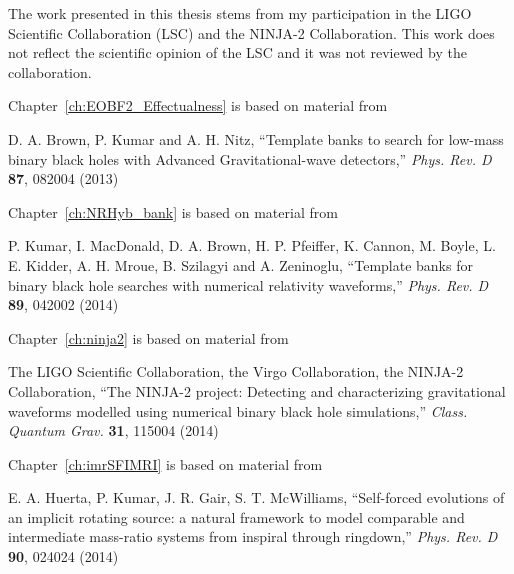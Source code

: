 
The work presented in this thesis stems from my participation in the
LIGO Scientific Collaboration (LSC) and the NINJA-2 Collaboration.  This
work does not reflect the scientific opinion of the LSC and it was not
reviewed by the collaboration.

\vspace*{0.5cm}

\noindent Chapter~\ref{ch:EOBF2_Effectualness} is based on material from

\vspace*{0.25cm}

\noindent D. A. Brown, P. Kumar and A. H. Nitz, ``Template banks to 
search for low-mass binary black holes with Advanced Gravitational-wave 
detectors,''
{\it Phys. Rev. D} {\bf 87}, 082004 (2013)

\vspace*{0.5cm}

\noindent Chapter~\ref{ch:NRHyb_bank} is based on material from

\vspace*{0.25cm}

\noindent P. Kumar, I. MacDonald, D. A. Brown, H. P. Pfeiffer, K. Cannon,
M. Boyle, L. E. Kidder, A. H. Mroue, B. Szilagyi and A. Zeninoglu, 
``Template banks for binary black hole searches with numerical relativity
waveforms,''
{\it Phys. Rev. D} {\bf 89}, 042002 (2014)

\vspace*{0.5cm}

\noindent Chapter~\ref{ch:ninja2} is based on material from

\vspace*{0.25cm}

\noindent The LIGO Scientific Collaboration, the Virgo Collaboration, 
the NINJA-2 Collaboration, ``The NINJA-2 project: 
Detecting and characterizing gravitational waveforms modelled using 
numerical binary black hole simulations,''
{\it Class. Quantum Grav.} {\bf 31}, 115004 (2014)

\vspace*{0.5cm}

% 
% 
% 

\noindent Chapter~\ref{ch:imrSFIMRI} is based on material from

\vspace*{0.25cm}

\noindent E. A. Huerta, P. Kumar, J. R. Gair, S. T. McWilliams, 
``Self-forced evolutions of an implicit rotating source:
a natural framework to model comparable and intermediate mass-ratio 
systems from inspiral through ringdown,''
{\it Phys. Rev. D} {\bf 90}, 024024 (2014)

\vspace*{0.5cm}
